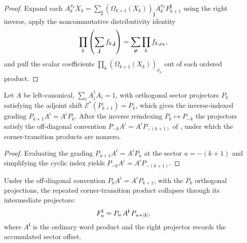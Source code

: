 \begin{proof}\leanok
    Expand each
    $A_k^{\sigma_k}X_k
        =\sum_{\mathbf j}(\Omega_{k+1}(X_k))_{\mathbf j}
        A_k^{\sigma_k}F_{k+1}^{\mathbf j}$ using the right inverse, apply the
    noncommutative distributivity identity
    \begin{align}
        \prod_k\left(\sum_{\mathbf j} f_{k,\mathbf j}\right)
         & =
        \sum_{\boldsymbol\rho}\prod_k f_{k,\rho_k},
        \notag
    \end{align}
    and pull the scalar coefficients
    $\prod_k(\Omega_{k+1}(X_k))_{\rho_k}$ out of each ordered product.
\end{proof}

\begin{lemma}
    \label{lem:periodic_negreindex_shift}
    \leanok
    Let $A$ be left-canonical, $\sum_i A_i^\dagger A_i=1$, with orthogonal sector
    projectors $P_k$ satisfying the adjoint shift $\mathcal E^*(P_{k+1})=P_k$,
    which gives the inverse-indexed grading $P_{k+1}A^i=A^iP_k$. After the
    inverse reindexing $P_k\mapsto P_{-k}$ the projectors satisfy the
    off-diagonal convention $P_{-k}A^i=A^iP_{-(k+1)}$ of
    \cite[eq.~Auprop]{DeLasCuevas2017Irreducible}, under which the
    corner-transition products are nonzero.
\end{lemma}

\begin{proof}\leanok
    Evaluating the grading $P_{u+1}A^i=A^iP_u$ at the sector $u=-(k+1)$ and
    simplifying the cyclic index yields $P_{-k}A^i=A^iP_{-(k+1)}$.
\end{proof}

\begin{lemma}
    \label{lem:periodic_cornerprod_telescope}
    \leanok
    Under the off-diagonal convention $P_kA^i=A^iP_{k+1}$, with the $P_k$
    orthogonal projections, the repeated corner-transition product collapses
    through its intermediate projectors:
    \begin{align}
        F_u^{\mathbf i}
         & =
        P_u\,A^{\mathbf i}\,P_{u+|\mathbf i|},
        \notag
    \end{align}
    where $A^{\mathbf i}$ is the ordinary word product and the right projector
    records the accumulated sector offset.
\end{lemma}


